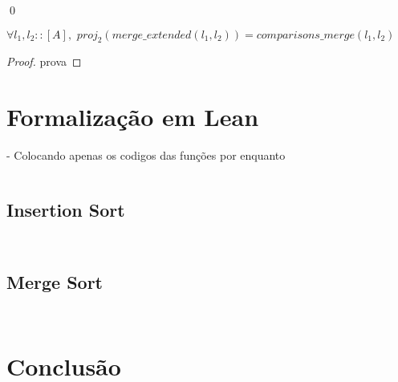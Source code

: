 \documentclass[12pt, oneside, a4paper,english,brazil]{abntex2}
\begin{document}
\qed

\begin{teorema}
  $\forall l_{1}, l_{2} :: [A], \,\, proj_{2}(merge\_extended(l_{1}, l_{2})) = comparisons\_merge(l_{1}, l_{2})$
\end{teorema}

\begin{proof}
  prova
\end{proof}


\chapter{Formaliza\c{c}\~ao em Lean}
- Colocando apenas os codigos das fun\c{c}\~oes por enquanto

\inputminted{lean}{declarations.lean}
\section{Insertion Sort}
\inputminted{lean}{insertion_sort.lean}
\inputminted{lean}{insertion_sort_modified.lean}

\section{Merge Sort}

\inputminted{lean}{merge_sort.lean}
\inputminted{lean}{merge_sort_modified.lean}

\chapter{Conclus\~ao}

\postextual


% 

\end{document}
